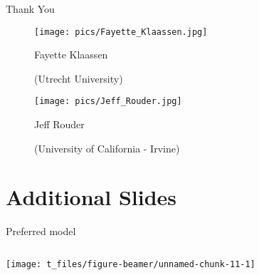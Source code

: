 \documentclass[ignorenonframetext,t]{beamer}
\begin{document}
\begin{frame}{Thank You}

\vspace*{1cm}

\begin{figure}
\centering
\begin{minipage}{.5\textwidth}
  \centering
  \texttt{[image: pics/Fayette\_Klaassen.jpg]}
  
  Fayette Klaassen 
  
  (Utrecht University)
\end{minipage}%
\begin{minipage}{.5\textwidth}
  \centering
  \texttt{[image: pics/Jeff\_Rouder.jpg]}
  
  Jeff Rouder 
  
  (University of California - Irvine)
\end{minipage}
\end{figure}

\end{frame}

\section{Additional Slides}\label{additional-slides}

\begin{frame}{Preferred model}

\vspace*{1cm}

\begin{columns}


\begin{center}\texttt{[image: t\_files/figure-beamer/unnamed-chunk-11-1]} \end{center}

\end{columns}

\end{frame}
\end{document}
